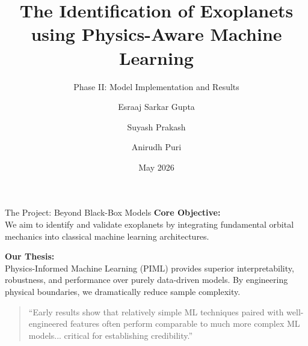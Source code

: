 \documentclass[9pt, aspectratio=169]{beamer}
\title{The Identification of Exoplanets using Physics-Aware Machine Learning}
\subtitle{Phase II: Model Implementation and Results}
\author{Esraaj Sarkar Gupta \and Suyash Prakash \and Anirudh Puri}
\date{May 2026}
\institute{Machine Learning and Pattern Recognition | Plaksha University}
\begin{document}
\maketitle

\begin{frame}{The Project: Beyond Black-Box Models}
    \textbf{Core Objective:} \\
    We aim to identify and validate exoplanets by integrating fundamental orbital mechanics into classical machine learning architectures. 
    
    \vspace{1em}
    \textbf{Our Thesis:} \\
    Physics-Informed Machine Learning (PIML) provides superior interpretability, robustness, and performance over purely data-driven models. By engineering physical boundaries, we dramatically reduce sample complexity.
    
    \vspace{1em}
    \begin{quote}
        ``Early results show that relatively simple ML techniques paired with well-engineered features often perform comparable to much more complex ML models... critical for establishing credibility.'' \footnotemark
    \end{quote}
    
\end{frame}
\end{document}
